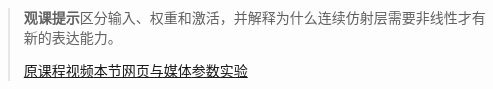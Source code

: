 \begin{quote}\small\textbf{观课提示}\quad 区分输入、权重和激活，并解释为什么连续仿射层需要非线性才有新的表达能力。

\href{https://www.youtube.com/watch?v=aircAruvnKk}{原课程视频}\quad\href{https://vitael04213.github.io/3blue1brown-notes/lessons/neural-networks.html}{本节网页与媒体}\quad\href{https://vitael04213.github.io/3blue1brown-notes/lab.html\#network}{参数实验}
\end{quote}
